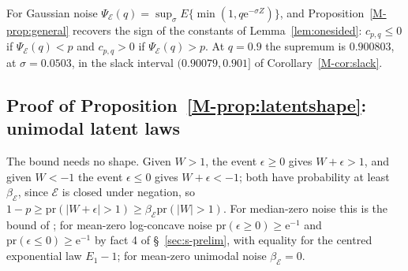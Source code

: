 \documentclass[11pt]{article}
\renewcommand{\_}{\usc\allowbreak}
\newcommand{\pr}{\mathrm{pr}}
\begin{document}
For Gaussian noise $\Psi_{\mathcal E}(q) = \sup_{\sigma} E\{\min(1, q \mathrm{e}^{-\sigma Z})\}$, and Proposition~\ref{M-prop:general} recovers the sign of the constants of Lemma~\ref{lem:onesided}: $c_{p,q} \le 0$ if $\Psi_{\mathcal E}(q) < p$ and $c_{p,q} > 0$ if $\Psi_{\mathcal E}(q) > p$. At $q = 0.9$ the supremum is $0.900803$, at $\sigma = 0.0503$, in the slack interval $(0.90079, 0.901]$ of Corollary~\ref{M-cor:slack}.

\subsection*{Proof of Proposition~\ref{M-prop:latentshape}: unimodal latent laws}

The bound needs no shape. Given $W > 1$, the event $\epsilon \ge 0$ gives $W + \epsilon > 1$, and given $W < -1$ the event $\epsilon \le 0$ gives $W + \epsilon < -1$; both have probability at least $\beta_{\mathcal E}$, since $\mathcal E$ is closed under negation, so $1 - p \ge \pr(|W + \epsilon| > 1) \ge \beta_{\mathcal E}\pr(|W| > 1)$. For median-zero noise this is the bound of \citet{guille2024}; for mean-zero log-concave noise $\pr(\epsilon \ge 0) \ge \mathrm{e}^{-1}$ and $\pr(\epsilon \le 0) \ge \mathrm{e}^{-1}$ by fact 4 of \S~\ref{sec:s-prelim}, with equality for the centred exponential law $E_1 - 1$; for mean-zero unimodal noise $\beta_{\mathcal E} = 0$.
\end{document}
